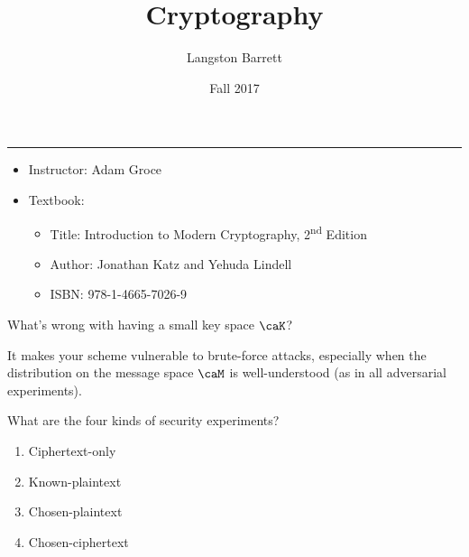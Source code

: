 \documentclass[a5paper]{article}
\begin{document}
\title{Cryptography}
\author{Langston Barrett}
\date{Fall 2017}
\maketitle
\tableofcontents
\vspace{1em}
\hrule
\vspace{1em}

\begin{itemize}
  \item Instructor: Adam Groce
  \item Textbook:
    \begin{itemize}
      \item Title: Introduction to Modern Cryptography, 2\textsuperscript{nd} Edition
      \item Author: Jonathan Katz and Yehuda Lindell
      \item ISBN: 978-1-4665-7026-9
    \end{itemize}
\end{itemize}

\begin{note}
  \begin{field}
    What's wrong with having a small key space $\caK$?
  \end{field}

  \begin{field}
    It makes your scheme vulnerable to brute-force attacks, especially when the
    distribution on the message space $\caM$ is well-understood (as in all
    adversarial experiments).
  \end{field}
\end{note}

\begin{note}
  \begin{field}
    What are the four kinds of security experiments?
  \end{field}

  \begin{field}
    \begin{enumerate}%
      \itemsep0em
      \item Ciphertext-only
      \item Known-plaintext
      \item Chosen-plaintext
      \item Chosen-ciphertext
    \end{enumerate}
  \end{field}
\end{note}
\end{document}
